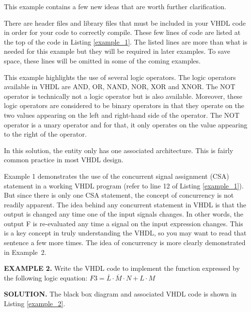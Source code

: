 This example contains a few new ideas that are worth further clarification.
\begin{my_list}
\item There are header files and library files that must be included in your VHDL code in order for your code to correctly compile. These few lines of code are listed at the top of the code in Listing \ref{example_1}. The listed lines are more than what is needed for this example but they will be required in later examples. To save space, these lines will be omitted in some of the coming examples.
\item This example highlights the use of several logic operators. The logic operators available in VHDL are AND, OR, NAND, NOR, XOR and XNOR. The NOT operator is technically not a logic operator but is also available. Moreover, these logic operators are considered to be binary operators in that they operate on the two values appearing on the left and right-hand side of the operator. The NOT operator is a unary operator and for that, it only operates on the value appearing to the right of the operator.
\item In this solution, the entity only has one associated architecture. This is fairly common practice in most VHDL design.
\end{my_list}
Example 1 demonstrates the use of the concurrent signal assignment (CSA) statement in a working VHDL program (refer to line 12 of Listing \ref{example_1}). But since there is only one CSA statement, the concept of concurrency is not readily apparent. The idea behind any concurrent statement in VHDL is that the output is changed any time one of the input signals changes. In other words, the output F is re-evaluated any time a signal on the input expression changes. This is a key concept in truly understanding the VHDL, so you may want to read that sentence a few more times. The idea of concurrency is more clearly demonstrated in Example~2.

\begin{leftbar}
\noindent
\textbf{EXAMPLE 2.}
Write the VHDL code to implement the function expressed by the following logic equation: $F3=\overline{L} \cdot \overline{M}\cdot N+L\cdot M$
\end{leftbar}
\noindent
\textbf{SOLUTION.} The black box diagram and associated VHDL code is shown in Listing \ref{example_2}.

